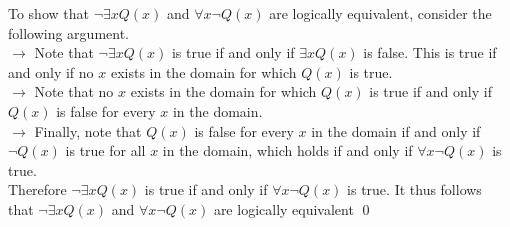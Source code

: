 \documentclass{article}
\newtheorem{remark}{Remark}[subsection]
\begin{document}
\begin{tcolorbox}
[colback=cyan!5!white,colframe=cyan!75!black,title=\begin{remark}
\end{remark}]
To show that $\neg \exists xQ(x)$ and $\forall x\neg Q(x)$ are logically equivalent, consider the following argument.\\
$\longrightarrow$ Note that $\neg \exists xQ(x)$ is true if and only if $\exists xQ(x)$ is false. This is true if and only if no $x$ exists in the domain for which $Q(x)$ is true.\\
$\longrightarrow$ Note that no $x$ exists in the domain for which $Q(x)$ is true if and only if $Q(x)$ is false for every $x$ in the domain.\\
$\longrightarrow$ Finally, note that $Q(x)$ is false for every $x$ in the domain if and only if $\neg Q(x)$ is true for all $x$ in the domain, which holds if and only if $\forall x\neg Q(x)$ is true.\\
Therefore $\neg \exists xQ(x)$ is true if and only if $\forall x\neg Q(x)$ is true. It thus follows that $\neg\exists xQ(x)$ and $\forall x\neg Q(x)$ are logically equivalent \qed
\end{tcolorbox}
\end{document}
